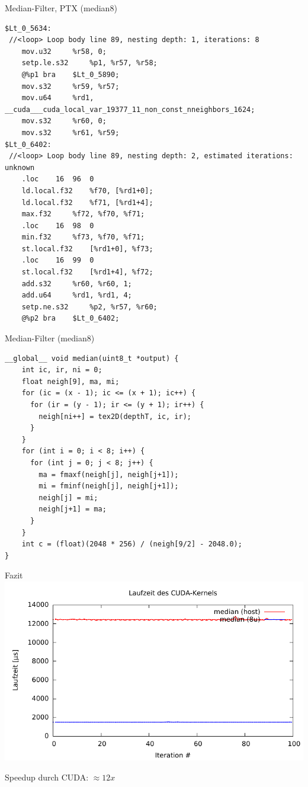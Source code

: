 \documentclass[compress]{beamer}
\begin{document}
\begin{frame}[fragile]{Median-Filter, PTX (median8)}
\lstset{basicstyle=\tiny\ttfamily}
\begin{lstlisting}
$Lt_0_5634:
 //<loop> Loop body line 89, nesting depth: 1, iterations: 8
    mov.u32     %r58, 0;
    setp.le.s32     %p1, %r57, %r58;
    @%p1 bra    $Lt_0_5890;
    mov.s32     %r59, %r57;
    mov.u64     %rd1, __cuda___cuda_local_var_19377_11_non_const_nneighbors_1624;
    mov.s32     %r60, 0;
    mov.s32     %r61, %r59;
$Lt_0_6402:
 //<loop> Loop body line 89, nesting depth: 2, estimated iterations: unknown
    .loc    16  96  0
    ld.local.f32    %f70, [%rd1+0];
    ld.local.f32    %f71, [%rd1+4];
    max.f32     %f72, %f70, %f71;
    .loc    16  98  0
    min.f32     %f73, %f70, %f71;
    st.local.f32    [%rd1+0], %f73;
    .loc    16  99  0
    st.local.f32    [%rd1+4], %f72;
    add.s32     %r60, %r60, 1;
    add.u64     %rd1, %rd1, 4;
    setp.ne.s32     %p2, %r57, %r60;
    @%p2 bra    $Lt_0_6402;
\end{lstlisting}
\end{frame}

\begin{frame}[fragile]{Median-Filter (median8)}
\lstset{basicstyle=\small\ttfamily}
\begin{lstlisting}
__global__ void median(uint8_t *output) {
    int ic, ir, ni = 0;
    float neigh[9], ma, mi;
    for (ic = (x - 1); ic <= (x + 1); ic++) {
      for (ir = (y - 1); ir <= (y + 1); ir++) {
        neigh[ni++] = tex2D(depthT, ic, ir);
      }
    }
    for (int i = 0; i < 8; i++) {
      for (int j = 0; j < 8; j++) {
        ma = fmaxf(neigh[j], neigh[j+1]);
        mi = fminf(neigh[j], neigh[j+1]);
        neigh[j] = mi;
        neigh[j+1] = ma;
      }
    }
    int c = (float)(2048 * 256) / (neigh[9/2] - 2048.0);
}
\end{lstlisting}
\end{frame}


\begin{frame}[fragile]{Fazit}
\includegraphics[width=\textwidth]{medianhost.pdf}\\
\begin{center}
Speedup durch CUDA: $\approx 12x$
\end{center}
\end{frame}
\end{document}
